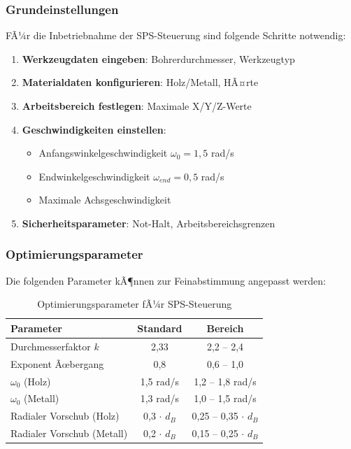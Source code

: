 ﻿\documentclass[12pt,a4paper]{article}
\begin{document}
\subsubsection{Grundeinstellungen}

FÃ¼r die Inbetriebnahme der SPS-Steuerung sind folgende Schritte notwendig:

\begin{enumerate}
	\item \textbf{Werkzeugdaten eingeben}: Bohrerdurchmesser, Werkzeugtyp
	\item \textbf{Materialdaten konfigurieren}: Holz/Metall, HÃ¤rte
	\item \textbf{Arbeitsbereich festlegen}: Maximale X/Y/Z-Werte
	\item \textbf{Geschwindigkeiten einstellen}: 
	\begin{itemize}
		\item Anfangswinkelgeschwindigkeit $\omega_0 = 1{,}5$ rad/s
		\item Endwinkelgeschwindigkeit $\omega_{end} = 0{,}5$ rad/s
		\item Maximale Achsgeschwindigkeit
	\end{itemize}
	\item \textbf{Sicherheitsparameter}: Not-Halt, Arbeitsbereichsgrenzen
\end{enumerate}

\subsubsection{Optimierungsparameter}

Die folgenden Parameter kÃ¶nnen zur Feinabstimmung angepasst werden:

\begin{table}[H]
	\centering
	\begin{tabular}{|l|c|c|}
		\hline
		\textbf{Parameter} & \textbf{Standard} & \textbf{Bereich} \\
		\hline
		Durchmesserfaktor $k$ & 2,33 & 2,2 -- 2,4 \\
		Exponent Ãœbergang & 0,8 & 0,6 -- 1,0 \\
		$\omega_0$ (Holz) & 1,5 rad/s & 1,2 -- 1,8 rad/s \\
		$\omega_0$ (Metall) & 1,3 rad/s & 1,0 -- 1,5 rad/s \\
		Radialer Vorschub (Holz) & 0,3 $\cdot$ $d_B$ & 0,25 -- 0,35 $\cdot$ $d_B$ \\
		Radialer Vorschub (Metall) & 0,2 $\cdot$ $d_B$ & 0,15 -- 0,25 $\cdot$ $d_B$ \\
		\hline
	\end{tabular}
	\caption{Optimierungsparameter fÃ¼r SPS-Steuerung}
\end{table}
\end{document}
